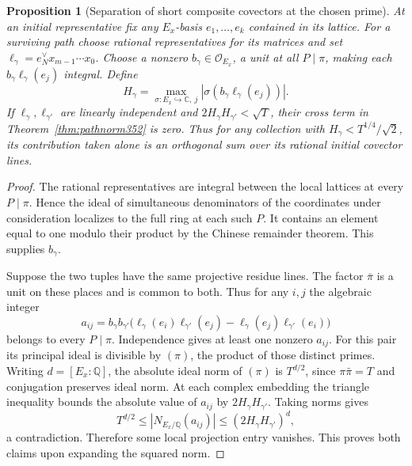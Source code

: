 \documentclass[a4paper,11pt]{article}
\newtheorem{proposition}{Proposition}[section]
\theoremstyle{definition}
\theoremstyle{remark}
\numberwithin{equation}{section}
\begin{document}
\begin{proposition}[Separation of short composite covectors at the chosen prime]\leavevmode
\label{prop:shortpaths352}
At an initial representative fix any \(E_x\)-basis
\(e_1,\ldots,e_k\) contained in its lattice. For a surviving path
choose rational representatives for its matrices and set
\(\ell_\gamma=e_N^\vee x_{m-1}\cdots x_0\).
Choose a nonzero \(b_\gamma\in\mathcal O_{E_x}\), a unit at all
\(P\mid\pi\), making each \(b_\gamma\ell_\gamma(e_j)\) integral.
Define
\[
      H_\gamma=\max_{\sigma:E_x\hookrightarrow\mathbb C,\ j}
                         |\sigma(b_\gamma\ell_\gamma(e_j))|.
\]
If \(\ell_\gamma,\ell_{\gamma'}\) are linearly independent and
\(2H_\gamma H_{\gamma'}<\sqrt T\), their cross term in
Theorem~\ref{thm:pathnorm352} is zero. Thus for any collection
with \(H_\gamma<T^{1/4}/\sqrt2\), its contribution taken alone
is an orthogonal sum over its rational initial covector lines.
\end{proposition}
\begin{proof}
The rational representatives are integral between the local
lattices at every \(P\mid\pi\). Hence the ideal of simultaneous
denominators of the coordinates under consideration localizes
to the full ring at each such \(P\). It contains an element
equal to one modulo their product by the Chinese remainder
theorem. This supplies \(b_\gamma\).

Suppose the two tuples have the same projective residue lines.
The factor \(\bar\pi\) is a unit on these places and is common
to both. Thus for any \(i,j\) the algebraic integer
\[
 a_{ij}=b_\gamma b_{\gamma'}
  \big(\ell_\gamma(e_i)\ell_{\gamma'}(e_j)
                -\ell_\gamma(e_j)\ell_{\gamma'}(e_i)\big)
\]
belongs to every \(P\mid\pi\). Independence gives at least one
nonzero \(a_{ij}\). For this pair its principal ideal is
divisible by \((\pi)\), the product of those distinct primes.
Writing \(d=[E_x:\mathbb Q]\), the absolute ideal norm of
\((\pi)\) is \(T^{d/2}\), since \(\pi\bar\pi=T\) and conjugation
preserves ideal norm. At each complex embedding the triangle
inequality bounds the absolute value of \(a_{ij}\) by
\(2H_\gamma H_{\gamma'}\). Taking norms gives
\[
                  T^{d/2}
                  \le |N_{E_x/\mathbb Q}(a_{ij})|
                  \le (2H_\gamma H_{\gamma'})^d ,
\]
a contradiction. Therefore some local projection entry vanishes.
This proves both claims upon expanding the squared norm.
\end{proof}
\end{document}
